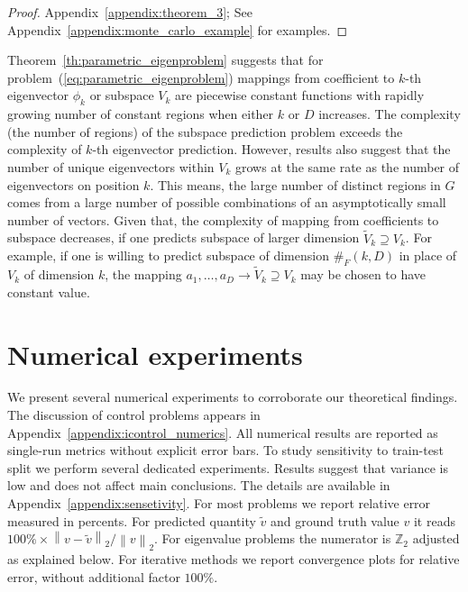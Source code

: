 \documentclass{article}
\begin{document}
\begin{proof}Appendix~\ref{appendix:theorem_3}; See Appendix~\ref{appendix:monte_carlo_example} for examples.
\end{proof}
Theorem~\ref{th:parametric_eigenproblem} suggests that for problem~(\ref{eq:parametric_eigenproblem}) mappings from coefficient to $k$-th eigenvector $\phi_k$ or subspace $V_k$ are piecewise constant functions with rapidly growing number of constant regions when either $k$ or $D$ increases. The complexity (the number of regions) of the subspace prediction problem exceeds the complexity of $k$-th eigenvector prediction. However, results also suggest that the number of unique eigenvectors within $V_k$ grows at the same rate as the number of eigenvectors on position $k$. This means, the large number of distinct regions in $G$ comes from a large number of possible combinations of an asymptotically small number of vectors. Given that, the complexity of mapping from coefficients to subspace decreases, if one predicts subspace of larger dimension $\widetilde{V}_k \supseteq V_k$. For example, if one is willing to predict subspace of dimension $\#_{F}(k, D)$ in place of $V_k$ of dimension $k$, the mapping $a_1,\dots, a_D \rightarrow \widetilde{V}_k\supseteq V_k$ may be chosen to have constant value.

\section{Numerical experiments}
\label{section:numerical_experiments}
We present several numerical experiments to corroborate our theoretical findings. The discussion of control problems appears in Appendix~\ref{appendix:icontrol_numerics}. All numerical results are reported as single-run metrics without explicit error bars. To study sensitivity to train-test split we perform several dedicated experiments. Results suggest that variance is low and does not affect main conclusions. The details are available in Appendix~\ref{appendix:sensetivity}. For most problems we report relative error measured in percents. For predicted quantity $\widetilde{v}$ and ground truth value $v$ it reads $100\%\times\left\|v - \widetilde{v}\right\|_2 \big/\left\| v\right\|_2$. For eigenvalue problems the numerator is $\mathbb{Z}_2$ adjusted as explained below. For iterative methods we report convergence plots for relative error, without additional factor $100\%$.
\end{document}
